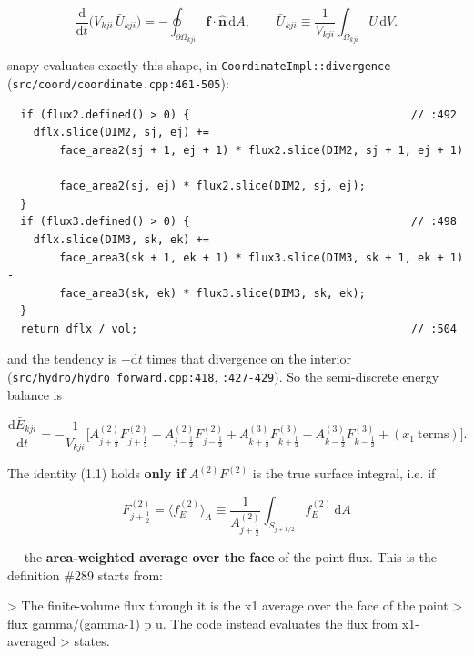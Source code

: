 \documentclass[11pt,a4paper]{article}
\begin{document}
\begin{equation*}
\frac{\mathrm{d}}{\mathrm{d}t}\Big(V_{kji}\,\bar U_{kji}\Big)
= -\oint_{\partial\Omega_{kji}} \mathbf{f}\cdot\hat{\mathbf{n}}\,\mathrm{d}A ,
\qquad
\bar U_{kji} \equiv \frac{1}{V_{kji}}\int_{\Omega_{kji}} U\,\mathrm{d}V .
\end{equation*}

snapy evaluates exactly this shape, in \texttt{CoordinateImpl::divergence}
(\texttt{src/coord/coordinate.cpp:461-505}):

\begin{lstlisting}
  if (flux2.defined() > 0) {                                  // :492
    dflx.slice(DIM2, sj, ej) +=
        face_area2(sj + 1, ej + 1) * flux2.slice(DIM2, sj + 1, ej + 1) -
        face_area2(sj, ej) * flux2.slice(DIM2, sj, ej);
  }
  if (flux3.defined() > 0) {                                  // :498
    dflx.slice(DIM3, sk, ek) +=
        face_area3(sk + 1, ek + 1) * flux3.slice(DIM3, sk + 1, ek + 1) -
        face_area3(sk, ek) * flux3.slice(DIM3, sk, ek);
  }
  return dflx / vol;                                          // :504
\end{lstlisting}

and the tendency is $-\mathrm{d}t$ times that divergence on the interior
(\texttt{src/hydro/hydro\_forward.cpp:418}, \texttt{:427-429}). So the semi-discrete energy
balance is

\begin{equation*}
\frac{\mathrm{d}\bar E_{kji}}{\mathrm{d}t}
= -\frac{1}{V_{kji}}\Big[
A^{(2)}_{j+\frac12}F^{(2)}_{j+\frac12} - A^{(2)}_{j-\frac12}F^{(2)}_{j-\frac12}
+ A^{(3)}_{k+\frac12}F^{(3)}_{k+\frac12} - A^{(3)}_{k-\frac12}F^{(3)}_{k-\frac12}
+ (x_1\ \text{terms})\Big].
\tag{1.1}
\end{equation*}

The identity (1.1) holds \textbf{only if} $A^{(2)}F^{(2)}$ is the true surface
integral, i.e. if

\begin{equation*}
\boxed{\;F^{(2)}_{j+\frac12}
= \big\langle f_E^{(2)} \big\rangle_{A}
\equiv \frac{1}{A^{(2)}_{j+\frac12}}\int_{S_{j+1/2}} f_E^{(2)}\,\mathrm{d}A \;}
\tag{1.2}
\end{equation*}

— the \textbf{area-weighted average over the face} of the point flux. This is the
definition \#289 starts from:

> The finite-volume flux through it is the x1 average over the face of the point
> flux gamma/(gamma-1) p u. The code instead evaluates the flux from x1-averaged
> states.
\end{document}

